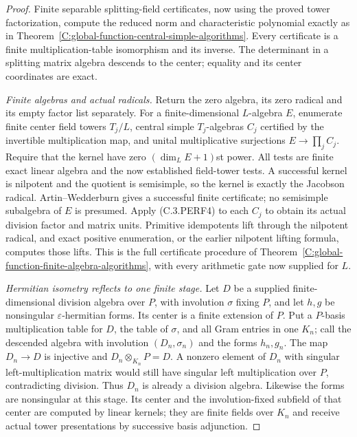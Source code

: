 \begin{proof}
Finite separable splitting-field certificates, now using the proved
tower factorization, compute the reduced norm and characteristic
polynomial exactly as in
Theorem~\ref{C:global-function-central-simple-algorithms}.
Every certificate is a finite multiplication-table isomorphism and
its inverse.  The determinant in a splitting matrix algebra descends
to the center; equality and its center coordinates are exact.

\emph{Finite algebras and actual radicals.}
Return the zero algebra, its zero radical and its empty factor list
separately.
For a finite-dimensional $L$-algebra $E$, enumerate finite center
field towers $T_j/L$, central simple $T_j$-algebras $C_j$ certified
by the invertible multiplication map, and unital multiplicative
surjections $E\to\prod_j C_j$.  Require that the kernel have zero
$(\dim_LE+1)$st power.  All tests are finite exact linear algebra
and the now established field-tower tests.  A successful kernel is
nilpotent and the quotient is semisimple, so the kernel is exactly
the Jacobson radical.  Artin--Wedderburn gives a successful finite
certificate; no semisimple subalgebra of $E$ is presumed.
Apply (C.3.PERF4) to each $C_j$ to obtain its actual division
factor and matrix units.  Primitive idempotents lift through the
nilpotent radical, and exact positive enumeration, or the earlier
nilpotent lifting formula, computes those lifts.  This is the full
certificate procedure of
Theorem~\ref{C:global-function-finite-algebra-algorithms}, with
every arithmetic gate now supplied for $L$.

\emph{Hermitian isometry reflects to one finite stage.}
Let $D$ be a supplied finite-dimensional division algebra over $P$,
with involution $\sigma$ fixing $P$, and let $h,g$ be nonsingular
$\varepsilon$-hermitian forms.  Its center is a finite extension
of $P$.  Put a $P$-basis multiplication table for $D$, the table
of $\sigma$, and all Gram entries in one $K_n$; call the descended
algebra with involution $(D_n,\sigma_n)$ and the forms $h_n,g_n$.
The map $D_n\to D$ is injective and $D_n\otimes_{K_n}P=D$.
A nonzero element of $D_n$ with singular left-multiplication
matrix would still have singular left multiplication over $P$,
contradicting division.  Thus $D_n$ is already a division algebra.
Likewise the forms are nonsingular at this stage.  Its center and
the involution-fixed subfield of that center are computed by linear
kernels; they are finite fields over $K_n$ and receive actual tower
presentations by successive basis adjunction.


\end{proof}

